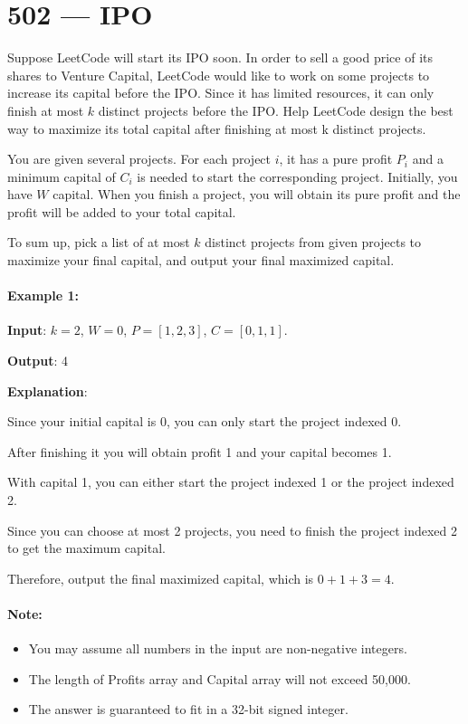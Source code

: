 \section{502 --- IPO}
Suppose LeetCode will start its IPO soon. In order to sell a good price of its shares to Venture Capital, LeetCode would like to work on some projects to increase its capital before the IPO. Since it has limited resources, it can only finish at most $k$ distinct projects before the IPO. Help LeetCode design the best way to maximize its total capital after finishing at most k distinct projects.

You are given several projects. For each project $i$, it has a pure profit $P_i$ and a minimum capital of $C_i$ is needed to start the corresponding project. Initially, you have $W$ capital. When you finish a project, you will obtain its pure profit and the profit will be added to your total capital.

To sum up, pick a list of at most $k$ distinct projects from given projects to maximize your final capital, and output your final maximized capital.

\paragraph{Example 1:}

\begin{flushleft}
\textbf{Input}: $k=2$, $W=0$, $P=[1,2,3]$, $C=[0,1,1]$.

\textbf{Output}: 4

\textbf{Explanation}: 

Since your initial capital is 0, you can only start the project indexed 0.

After finishing it you will obtain profit 1 and your capital becomes 1.

With capital 1, you can either start the project indexed 1 or the project indexed 2.

Since you can choose at most 2 projects, you need to finish the project indexed 2 to get the maximum capital.

Therefore, output the final maximized capital, which is $0 + 1 + 3 = 4$.
\end{flushleft}

\paragraph{Note:}

\begin{itemize}
\item You may assume all numbers in the input are non-negative integers.
\item The length of Profits array and Capital array will not exceed 50,000.
\item The answer is guaranteed to fit in a 32-bit signed integer.
\end{itemize}

